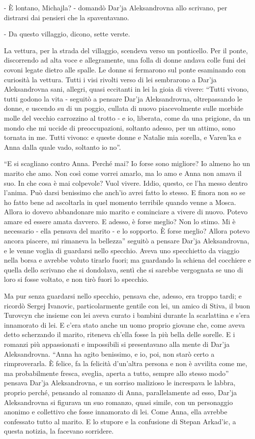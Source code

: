 - È lontano, Michajla? - domandò Dar'ja Aleksandrovna allo scrivano, per distrarsi dai pensieri che la spaventavano. 

- Da questo villaggio, dicono, sette verste. 

La vettura, per la strada del villaggio, scendeva verso un ponticello. Per il ponte, discorrendo ad alta voce e allegramente, una folla di donne andava colle funi dei covoni legate dietro alle spalle. Le donne si fermarono sul ponte esaminando con curiosità la vettura. Tutti i visi rivolti verso di lei sembrarono a Dar'ja Aleksandrovna sani, allegri, quasi eccitanti in lei la gioia di vivere: ``Tutti vivono, tutti godono la vita - seguitò a pensare Dar'ja Aleksandrovna, oltrepassando le donne, e uscendo su di un poggio, cullata di nuovo piacevolmente sulle morbide molle del vecchio carrozzino al trotto - e io, liberata, come da una prigione, da un mondo che mi uccide di preoccupazioni, soltanto adesso, per un attimo, sono tornata in me. Tutti vivono: e queste donne e Natalie mia sorella, e Varen'ka e Anna dalla quale vado, soltanto io no''. 

``E si scagliano contro Anna. Perché mai? Io forse sono migliore? Io almeno ho un marito che amo. Non così come vorrei amarlo, ma lo amo e Anna non amava il suo. In che cosa è mai colpevole? Vuol vivere. Iddio, questo, ce l'ha messo dentro l'anima. Può darsi benissimo che anch'io avrei fatto lo stesso. E finora non so se ho fatto bene ad ascoltarla in quel momento terribile quando venne a Mosca. Allora io dovevo abbandonare mio marito e cominciare a vivere di nuovo. Potevo amare ed essere amata davvero. E adesso, è forse meglio? Non lo stimo. Mi è necessario - ella pensava del marito - e lo sopporto. È forse meglio? Allora potevo ancora piacere, mi rimaneva la bellezza'' seguitò a pensare Dar'ja Aleksandrovna, e le venne voglia di guardarsi nello specchio. Aveva uno specchietto da viaggio nella borsa e avrebbe voluto tirarlo fuori; ma guardando la schiena del cocchiere e quella dello scrivano che si dondolava, sentì che si sarebbe vergognata se uno di loro si fosse voltato, e non tirò fuori lo specchio. 

Ma pur senza guardarsi nello specchio, pensava che, adesso, era troppo tardi; e ricordò Sergej Ivanovic, particolarmente gentile con lei, un amico di Stiva, il buon Turovcyn che insieme con lei aveva curato i bambini durante la scarlattina e s'era innamorato di lei. E c'era stato anche un uomo proprio giovane che, come aveva detto scherzando il marito, riteneva ch'ella fosse la più bella delle sorelle. E i romanzi più appassionati e impossibili si presentavano alla mente di Dar'ja Aleksandrovna. ``Anna ha agito benissimo, e io, poi, non starò certo a rimproverarla. È felice, fa la felicità d'un'altra persona e non è avvilita come me, ma probabilmente fresca, sveglia, aperta a tutto, sempre allo stesso modo'' pensava Dar'ja Aleksandrovna, e un sorriso malizioso le increspava le labbra, proprio perché, pensando al romanzo di Anna, parallelamente ad esso, Dar'ja Aleksandrovna si figurava un suo romanzo, quasi simile, con un personaggio anonimo e collettivo che fosse innamorato di lei. Come Anna, ella avrebbe confessato tutto al marito. E lo stupore e la confusione di Stepan Arkad'ic, a questa notizia, la facevano sorridere. 

